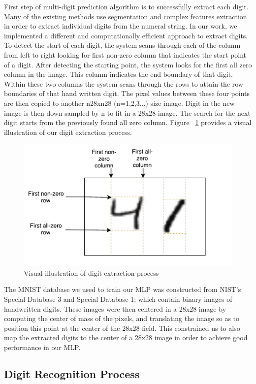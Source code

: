 \documentclass[sigconf]{acmart}
\theoremstyle{plain}
\theoremstyle{remark}
\begin{document}
First step of multi-digit prediction algorithm is to successfully extract each digit. Many of the existing methods use segmentation and complex features extraction in order to extract individual digits from the numeral string. In our work, we implemented a different and computationally efficient approach to extract digits. To detect the start of each digit, the system scans through each of the column from left to right looking for first non-zero column that indicates the start point of a digit. After detecting the starting point,  the system looks for the first all zero column in the image. This column indicates the end boundary of that digit. Within these two columns the system scans through the rows to attain the row boundaries of that hand written digit.  The pixel values between these four points are then copied to another n28xn28 (n=1,2,3...) size image. Digit in the new image is then down-sampled by n to fit in a 28x28 image. The search for the next digit starts from the previously found all zero column. Figure ~\ref{fig:digitExtract} provides a visual illustration of our digit extraction process.

\begin{figure} [hbt]
\centering
\includegraphics[width=.8\linewidth]{extract.pdf}
\caption{Visual illustration of digit extraction process}
\label{fig:digitExtract}
\end{figure}

The MNIST database we used to train our MLP was constructed from NIST's Special Database 3 and Special Database 1; which contain binary images of handwritten digits. These images were then centered in a 28x28 image by computing the center of mass of the pixels, and translating the image so as to position this point at the center of the 28x28 field. This constrained us to also map the extracted digits to the center of a 28x28 image in order to achieve good performance in our MLP.


\subsection{Digit Recognition Process}
\end{document}
